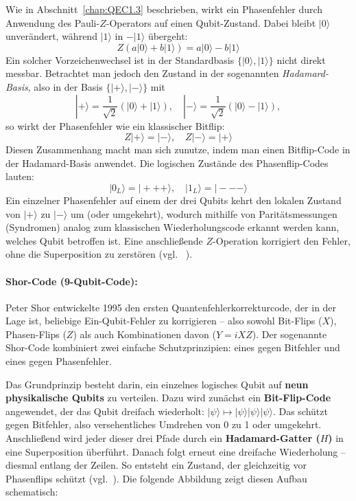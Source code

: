 Wie in Abschnitt~\ref{chap:QEC1.3} beschrieben, wirkt ein Phasenfehler durch Anwendung des Pauli-\(Z\)-Operators auf einen Qubit-Zustand. Dabei bleibt \(|0\rangle\) unverändert, während \(|1\rangle\) in \(-|1\rangle\) übergeht:
\[
Z(a|0\rangle + b|1\rangle) = a|0\rangle - b|1\rangle
\]
Ein solcher Vorzeichenwechsel ist in der Standardbasis \(\{|0\rangle, |1\rangle\}\) nicht direkt messbar. Betrachtet man jedoch den Zustand in der sogenannten \emph{Hadamard-Basis}, also in der Basis \(\{|+\rangle, |-\rangle\}\) mit
\[
|+\rangle = \frac{1}{\sqrt{2}}(|0\rangle + |1\rangle), \quad |-\rangle = \frac{1}{\sqrt{2}}(|0\rangle - |1\rangle),
\]
so wirkt der Phasenfehler wie ein klassischer Bitflip:
\[
Z|+\rangle = |-\rangle, \quad Z|-\rangle = |+\rangle
\]
Diesen Zusammenhang macht man sich zunutze, indem man einen Bitflip-Code in der Hadamard-Basis anwendet. Die logischen Zustände des Phasenflip-Codes lauten:
\[
|0_L\rangle = |+++\rangle, \quad |1_L\rangle = |---\rangle
\]
Ein einzelner Phasenfehler auf einem der drei Qubits kehrt den lokalen Zustand von \(|+\rangle\) zu \(|-\rangle\) um (oder umgekehrt), wodurch mithilfe von Paritätsmessungen (Syndromen) analog zum klassischen Wiederholungscode erkannt werden kann, welches Qubit betroffen ist. Eine anschließende \(Z\)-Operation korrigiert den Fehler, ohne die Superposition zu zerstören (vgl.~\cite[430-431]{nielsen_quantum_2010} \cite[4]{devitt_quantum_2013}).

\paragraph{Shor-Code (9-Qubit-Code):}

Peter Shor entwickelte 1995 den ersten Quantenfehlerkorrekturcode, der in der Lage ist, beliebige Ein-Qubit-Fehler zu korrigieren – also sowohl Bit-Flips (\(X\)), Phasen-Flips (\(Z\)) als auch Kombinationen davon (\(Y = iXZ\)). Der sogenannte Shor-Code kombiniert zwei einfache Schutzprinzipien: eines gegen Bitfehler und eines gegen Phasenfehler.

Das Grundprinzip besteht darin, ein einzelnes logisches Qubit auf \textbf{neun physikalische Qubits} zu verteilen. Dazu wird zunächst ein \textbf{Bit-Flip-Code} angewendet, der das Qubit dreifach wiederholt: \( |\psi\rangle \mapsto |\psi\rangle |\psi\rangle |\psi\rangle \). Das schützt gegen Bitfehler, also versehentliches Umdrehen von 0 zu 1 oder umgekehrt.
Anschließend wird jeder dieser drei Pfade durch ein \textbf{Hadamard-Gatter (\(H\))} in eine Superposition überführt. Danach folgt erneut eine dreifache Wiederholung – diesmal entlang der Zeilen. So entsteht ein Zustand, der gleichzeitig vor Phasenflips schützt (vgl.~\cite[10-11]{devitt_quantum_2013}).
Die folgende Abbildung zeigt diesen Aufbau schematisch:

